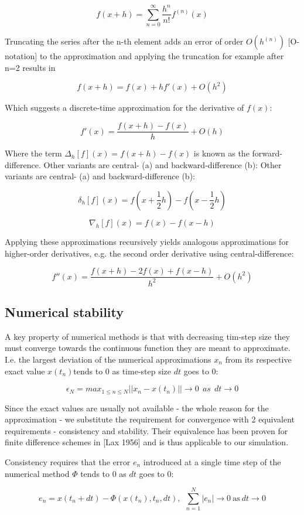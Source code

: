 \documentclass[12pt]{article}
\begin{document}
 $$f(x+h) = \sum_{n=0}^\infty \frac{h^n}{n!}f^{(n)}(x)$$
 
 Truncating the series after the n-th element adds an error of order $O(h^{(n)})$ [O-notation] to the approximation and applying the truncation for example after n=2 results in 
 
 $$f(x+h)=f(x)+hf'(x)+O(h^2)$$
 
 Which suggests a discrete-time approximation for the derivative of $f(x)$:
 
 $$f'(x)=\frac{f(x+h)-f(x)}{h}+O(h)$$
 
 Where the term $\Delta_h[f](x)=f(x+h)-f(x)$ is known as the forward-difference. Other variants are central- (a) and backward-difference (b): Other variants are central- (a) and backward-difference (b):
 
 $$\delta_h[f](x)=f(x+\frac{1}{2}h)-f(x-\frac{1}{2}h)$$
 
 $$\nabla_h[f](x) = f(x)-f(x-h)$$
 
 Applying these approximations recursively yields analogous approximations for higher-order derivatives, e.g. the second order derivative using central-difference:
 
 $$f''(x)=\frac{f(x+h)-2f(x)+f(x-h)}{h^2}+O(h^2)$$
 
 
 \subsection{Numerical stability}
 
 A key property of numerical methods is that with decreasing tim-step size they must converge towards the continuous function they are meant to approximate. I.e. the largest deviation of the numerical approximations $x_n$ from its respective exact value $x(t_n)$tends to 0 as time-step size $dt$ goes to 0:
 
 $$\epsilon_N=max_{1\le n\le N}||x_n-x(t_n)||\to0\ \ as\ \ dt\to 0$$
 
 Since the exact values are usually not available - the whole reason for the approximation - we substitute the requirement for convergence with 2 equivalent requirements - consistency and stability. Their equivalence has been proven for finite difference schemes in [Lax 1956] and is thus applicable to our simulation.
 
 Consistency requires that the error $e_n$ introduced at a single time step of the numerical method $\Phi$ tends to 0 as $dt$ goes to 0:
 
 $$e_n = x(t_n+dt) - \Phi(x(t_n),t_n,dt),\ \ \sum_{n=1}^N|e_n|\to 0\ \mathrm{as}\ dt\to 0$$
 
\end{document}
